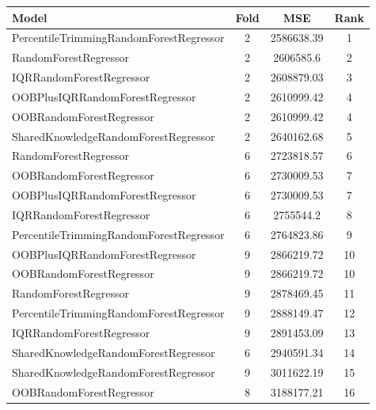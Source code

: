 \begin{table}[h]
\centering
\begin{tabular}{|l|c|c|c|}
\hline
Model & Fold & MSE & Rank \\ \hline
\textcolor[HTML]{f46a9b}{PercentileTrimmingRandomForestRegressor} & 2 & 2586638.39 & 1 \\ \hline
\textcolor[HTML]{87bc45}{RandomForestRegressor} & 2 & 2606585.6 & 2 \\ \hline
\textcolor[HTML]{27aeef}{IQRRandomForestRegressor} & 2 & 2608879.03 & 3 \\ \hline
\textcolor[HTML]{ede15b}{OOBPlusIQRRandomForestRegressor} & 2 & 2610999.42 & 4 \\ \hline
\textcolor[HTML]{b33dc6}{OOBRandomForestRegressor} & 2 & 2610999.42 & 4 \\ \hline
\textcolor[HTML]{ef9b20}{SharedKnowledgeRandomForestRegressor} & 2 & 2640162.68 & 5 \\ \hline
\textcolor[HTML]{87bc45}{RandomForestRegressor} & 6 & 2723818.57 & 6 \\ \hline
\textcolor[HTML]{b33dc6}{OOBRandomForestRegressor} & 6 & 2730009.53 & 7 \\ \hline
\textcolor[HTML]{ede15b}{OOBPlusIQRRandomForestRegressor} & 6 & 2730009.53 & 7 \\ \hline
\textcolor[HTML]{27aeef}{IQRRandomForestRegressor} & 6 & 2755544.2 & 8 \\ \hline
\textcolor[HTML]{f46a9b}{PercentileTrimmingRandomForestRegressor} & 6 & 2764823.86 & 9 \\ \hline
\textcolor[HTML]{ede15b}{OOBPlusIQRRandomForestRegressor} & 9 & 2866219.72 & 10 \\ \hline
\textcolor[HTML]{b33dc6}{OOBRandomForestRegressor} & 9 & 2866219.72 & 10 \\ \hline
\textcolor[HTML]{87bc45}{RandomForestRegressor} & 9 & 2878469.45 & 11 \\ \hline
\textcolor[HTML]{f46a9b}{PercentileTrimmingRandomForestRegressor} & 9 & 2888149.47 & 12 \\ \hline
\textcolor[HTML]{27aeef}{IQRRandomForestRegressor} & 9 & 2891453.09 & 13 \\ \hline
\textcolor[HTML]{ef9b20}{SharedKnowledgeRandomForestRegressor} & 6 & 2940591.34 & 14 \\ \hline
\textcolor[HTML]{ef9b20}{SharedKnowledgeRandomForestRegressor} & 9 & 3011622.19 & 15 \\ \hline
\textcolor[HTML]{b33dc6}{OOBRandomForestRegressor} & 8 & 3188177.21 & 16 \\ \hline

\end{tabular}
\end{table}

